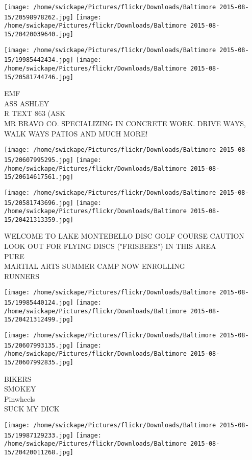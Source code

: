 \documentclass[10pt,letterpaper]{article}
\begin{document}
\texttt{[image: /home/swickape/Pictures/flickr/Downloads/Baltimore 2015-08-15/20598978262.jpg]}
\texttt{[image: /home/swickape/Pictures/flickr/Downloads/Baltimore 2015-08-15/20420039640.jpg]}

\texttt{[image: /home/swickape/Pictures/flickr/Downloads/Baltimore 2015-08-15/19985442434.jpg]}
\texttt{[image: /home/swickape/Pictures/flickr/Downloads/Baltimore 2015-08-15/20581744746.jpg]}

EMF\\
ASS ASHLEY\\
R TEXT 863 (ASK\\
MR BRAVO CO. SPECIALIZING IN CONCRETE WORK.  DRIVE WAYS, WALK WAYS PATIOS AND MUCH MORE!\\
\pagebreak

\texttt{[image: /home/swickape/Pictures/flickr/Downloads/Baltimore 2015-08-15/20607995295.jpg]}
\texttt{[image: /home/swickape/Pictures/flickr/Downloads/Baltimore 2015-08-15/20614617561.jpg]}

\texttt{[image: /home/swickape/Pictures/flickr/Downloads/Baltimore 2015-08-15/20581743696.jpg]}
\texttt{[image: /home/swickape/Pictures/flickr/Downloads/Baltimore 2015-08-15/20421313359.jpg]}

WELCOME TO LAKE MONTEBELLO DISC GOLF COURSE CAUTION LOOK OUT FOR FLYING DISCS ("FRISBEES") IN THIS AREA\\
PURE\\
MARTIAL ARTS SUMMER CAMP NOW ENROLLING\\
RUNNERS\\
\pagebreak

\texttt{[image: /home/swickape/Pictures/flickr/Downloads/Baltimore 2015-08-15/19985440124.jpg]}
\texttt{[image: /home/swickape/Pictures/flickr/Downloads/Baltimore 2015-08-15/20421312499.jpg]}

\texttt{[image: /home/swickape/Pictures/flickr/Downloads/Baltimore 2015-08-15/20607993135.jpg]}
\texttt{[image: /home/swickape/Pictures/flickr/Downloads/Baltimore 2015-08-15/20607992835.jpg]}

BIKERS\\
SMOKEY\\
Pinwheels\\
SUCK MY DICK\\
\pagebreak

\texttt{[image: /home/swickape/Pictures/flickr/Downloads/Baltimore 2015-08-15/19987129233.jpg]}
\texttt{[image: /home/swickape/Pictures/flickr/Downloads/Baltimore 2015-08-15/20420011268.jpg]}
\end{document}
